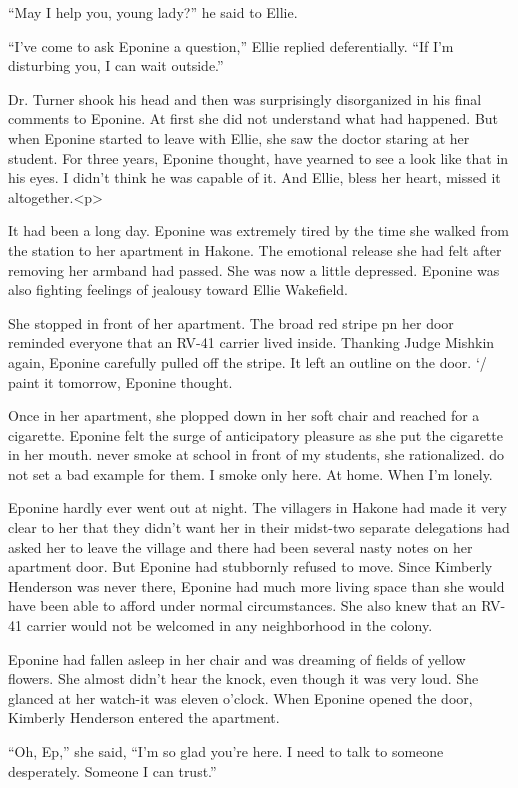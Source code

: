 \documentclass[]{article}
\begin{document}
{“May I help you, young lady?” he said to Ellie.

“I’ve come to ask Eponine a question,” Ellie replied deferentially. “If I’m disturbing you, I can wait outside.”

Dr. Turner shook his head and then was surprisingly disorganized in his final comments to Eponine. At first she did not understand what had happened. But when Eponine started to leave with Ellie, she saw the doctor staring at her student. For three years, Eponine thought, have yearned to see a look like that in his eyes. I didn’t think he was capable of it. And Ellie, bless her heart, missed it altogether.<p>

It had been a long day. Eponine was extremely tired by the time she walked from the station to her apartment in Hakone. The emotional release she had felt after removing her armband had passed. She was now a little depressed. Eponine was also fighting feelings of jealousy toward Ellie Wakefield.

She stopped in front of her apartment. The broad red stripe pn her door reminded everyone that an RV-41 carrier lived inside. Thanking Judge Mishkin again, Eponine carefully pulled off the stripe. It left an outline on the door. ‘/ paint it tomorrow, Eponine thought.

Once in her apartment, she plopped down in her soft chair and reached for a cigarette. Eponine felt the surge of anticipatory pleasure as she put the cigarette in her mouth. never smoke at school in front of my students, she rationalized. do not set a bad example for them. I smoke only here. At home. When I’m lonely.

Eponine hardly ever went out at night. The villagers in Hakone had made it very clear to her that they didn’t want her in their midst-two separate delegations had asked her to leave the village and there had been several nasty notes on her apartment door. But Eponine had stubbornly refused to move. Since Kimberly Henderson was never there, Eponine had much more living space than she would have been able to afford under normal circumstances. She also knew that an RV-41 carrier would not be welcomed in any neighborhood in the colony.

Eponine had fallen asleep in her chair and was dreaming of fields of yellow flowers. She almost didn’t hear the knock, even though it was very loud. She glanced at her watch-it was eleven o’clock. When Eponine opened the door, Kimberly Henderson entered the apartment.

“Oh, Ep,” she said, “I’m so glad you’re here. I need to talk to someone desperately. Someone I can trust.”

}
\end{document}
